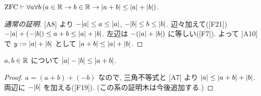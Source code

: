 \begin{thm}\label{thm:triangle}
  $\mathrm{ZFC} \vdash \forall a\forall b\,(a \in \mathbb{R} \to b \in \mathbb{R} \to \lvert a + b\rvert \leq \lvert a\rvert + \lvert b\rvert)$.
\end{thm}
\begin{proof}[通常の証明]
  [A8] より $-\lvert a\rvert \leq a \leq \lvert a\rvert$, $-\lvert b\rvert \leq b \leq \lvert b\rvert$. 辺々加えて([F21]) $-\lvert a\rvert + (-\lvert b\rvert) \leq a + b \leq \lvert a\rvert + \lvert b\rvert$. 左辺は $-(\lvert a\rvert + \lvert b\rvert)$ に等しい([F7]). よって [A10] で $y := \lvert a\rvert + \lvert b\rvert$ として $\lvert a + b\rvert \leq \lvert a\rvert + \lvert b\rvert$.
\end{proof}

\begin{cor}[テキスト練習問題1.2]\label{cor:reverse-triangle}
  $a, b \in \mathbb{R}$ について $\lvert a\rvert - \lvert b\rvert \leq \lvert a + b\rvert$.
\end{cor}
\begin{proof}
  $a = (a + b) + (-b)$ なので, 三角不等式と [A7] より $\lvert a\rvert \leq \lvert a + b\rvert + \lvert b\rvert$. 両辺に $-\lvert b\rvert$ を加える([F19]). (この系の証明木は今後追加する.)
\end{proof}
